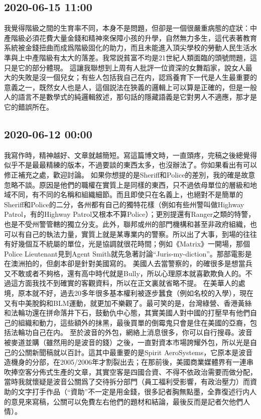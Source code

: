 \documentclass[twocolumn]{ctexart}
\begin{document}
\subsection*{2020-06-15 11:00}

我覺得階級之間的生育率不同，本身不是問題，但卻是一個很嚴重病態的症狀：中產階級必須花費大量金錢和精神來保障小孩的升學，自然無力多生，這代表著教育系統被金錢扭曲而成爲階級固化的助力，而且未能進入頂尖學校的勞動人民生活水準與上中產階級有太大的落差。我常説貧富不均是21世紀人類面臨的頭號問題，這只是它的部分體現。
這讓我聯想到上周有人批評一位資深的女舞蹈家，說女人最大的失敗是沒一個兒女；有些人包括我自己在内，認爲養育下一代是人生最重要的意義之一，既然女人也是人，這個説法在狹義的邏輯上可以算是正確的，但是一般人的語言不是數學式的純邏輯敘述，那句話的隱藏語義是它對男人不適應，那才是它的錯誤所在。
\subsection*{2020-06-12 00:00}

我寫作時，精神越好、文章就越簡短。寫這篇博文時，一直頭疼，完稿之後總覺得似乎不是最最精練的版本，不過要談的東西太多，也沒辦法了。你如果看出有可以修正補充之處，歡迎討論。
如果你想提的是Sheriff和Police的差別，我的確是故意忽略不談。原因是他們的職權在實質上是同樣的東西，只不過依母單位的層級和地域不同，有不同的名稱和組織細節。而且即使只在名義上，也絕對不是簡單的Sheriff和Police的二分，各州都有自己的獨特花樣（例如有些州警叫做Highway Patrol，有的Highway Patrol又根本不算Police）；更別提還有Ranger之類的特警，也是不受州警管轄的獨立分支。此外，聯邦或州的部門機構和甚至非政府組織，也可以有自己的執法力量，實質上就是某專業内的警察。所以出了大事，到場的往往有好幾個互不統屬的單位，光是協調就很花時間；例如《Matrix》一開場，那個Police Lieutenant見到Agent Smith就先急著討論“Juris-my-diction”。那部電影是在澳洲拍的，但劇本卻是針對美國寫的。
美國人去當警察的，的確很多是想當兵又不敢或者不夠格，還有高中時代就是Bully，所以心理原本就喜歡欺負人的。不過這方面我找不到確實的客觀資料，所以在正文裏就省略不提。
在美華人的處境，原本就不好，過去20多年很多基本權利被逐步蠶食（例如名校的入學），現在又有中美脫鈎和BLM運動，就更加不樂觀了。最可笑的是，台灣綠營、香港黃絲和法輪功還在拼命落井下石，鼓動仇中心態，其實美國人對中國的打壓早有他們自己的組織和動力，這些額外的抹黑，最後買單的倒霉鬼只會是住在美國的亞裔，包括法輪功自己在内。
至於波音的外包，網絡上消息很多，你可以自行搜尋。波音被麥道並購（雖然用的是波音的錢）之後，一直對資本市場誇耀外包，所以光是自己的公關新聞稿就以百計。這其中最重要的是Spirit AeroSystems，它原本是波音造機身的分部，在2005/2006年才割裂出去；在那前後，美國商業媒體界有一連串吹捧空客分佈式生產的文章，其實空客是四國合資、不得不依政治需要而做分配，當時我就懷疑是波音公關爲了交待拆分部門（員工福利受影響，有政治壓力）而資助的文字打手作品（“資助”不一定是用金錢，很多記者胸無點墨，全靠復述行内人的意見來寫稿，公關可以免費左右他們的題材和結論，最後反而是記者欠他們人情）。
\end{document}
